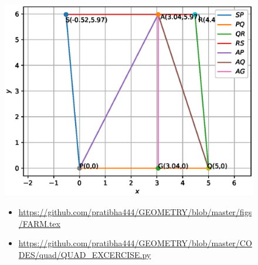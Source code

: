 \begin{frame}
\begin{figure}
\includegraphics[scale=.5]{./figs/farme.eps}\\
\begin{itemize}
\item \url{https://github.com/pratibha444/GEOMETRY/blob/master/figs/FARM.tex}\\
\item \url{https://github.com/pratibha444/GEOMETRY/blob/master/CODES/quad/QUAD_EXCERCISE.py}
\end{itemize}
\seti
\end{figure}
\end{frame}
